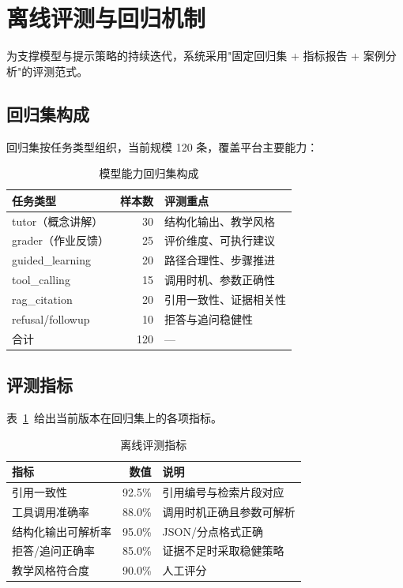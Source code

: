 \section{离线评测与回归机制}
为支撑模型与提示策略的持续迭代，系统采用"固定回归集 + 指标报告 + 案例分析"的评测范式。

\subsection{回归集构成}
回归集按任务类型组织，当前规模 120 条，覆盖平台主要能力：

\begin{table}[htbp]
  \centering
  \caption{模型能力回归集构成}
  \begin{tabular}{lrl}
    \toprule
    任务类型 & 样本数 & 评测重点 \\
    \midrule
    tutor（概念讲解） & 30 & 结构化输出、教学风格 \\
    grader（作业反馈） & 25 & 评价维度、可执行建议 \\
    guided\_learning & 20 & 路径合理性、步骤推进 \\
    tool\_calling & 15 & 调用时机、参数正确性 \\
    rag\_citation & 20 & 引用一致性、证据相关性 \\
    refusal/followup & 10 & 拒答与追问稳健性 \\
    \midrule
    合计 & 120 & — \\
    \bottomrule
  \end{tabular}
\end{table}

\subsection{评测指标}
表~\ref{tab:eval-metrics}~给出当前版本在回归集上的各项指标。

\begin{table}[htbp]
  \centering
  \caption{离线评测指标}
  \label{tab:eval-metrics}
  \begin{tabular}{lrl}
    \toprule
    指标 & 数值 & 说明 \\
    \midrule
    引用一致性 & 92.5\% & 引用编号与检索片段对应 \\
    工具调用准确率 & 88.0\% & 调用时机正确且参数可解析 \\
    结构化输出可解析率 & 95.0\% & JSON/分点格式正确 \\
    拒答/追问正确率 & 85.0\% & 证据不足时采取稳健策略 \\
    教学风格符合度 & 90.0\% & 人工评分 \\
    \bottomrule
  \end{tabular}
\end{table}

